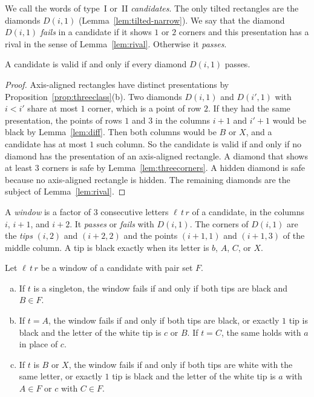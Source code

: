 We call the words of type~I or~II \emph{candidates}. The only tilted
rectangles are the diamonds $D(i,1)$ (Lemma~\ref{lem:tilted-narrow}). We say
that the diamond $D(i,1)$ \emph{fails} in a candidate if it shows $1$ or $2$
corners and this presentation has a rival in the sense of
Lemma~\ref{lem:rival}. Otherwise it \emph{passes}.

\begin{lemma}\label{lem:diamond}
A candidate is valid if and only if every diamond $D(i,1)$ passes.
\end{lemma}

\begin{proof}
Axis-aligned rectangles have distinct presentations by
Proposition~\ref{prop:threeclass}(b). Two diamonds $D(i,1)$ and $D(i',1)$ with
$i<i'$ share at most $1$ corner, which is a point of row $2$. If they had the
same presentation, the points of rows $1$ and $3$ in the columns $i+1$ and
$i'+1$ would be black by Lemma~\ref{lem:diff}. Then both columns would be $B$
or $X$, and a candidate has at most $1$ such column. So the candidate is valid
if and only if no diamond has the presentation of an axis-aligned rectangle.
A diamond that shows at least $3$ corners is safe by
Lemma~\ref{lem:threecorners}. A hidden diamond is safe because no axis-aligned
rectangle is hidden. The remaining diamonds are the subject of
Lemma~\ref{lem:rival}.
\end{proof}

A \emph{window} is a factor of $3$ consecutive letters $\ell\,t\,r$ of a
candidate, in the columns $i$, $i+1$, and $i+2$. It \emph{passes} or
\emph{fails} with $D(i,1)$. The corners of $D(i,1)$ are the \emph{tips} $(i,2)$
and $(i+2,2)$ and the points $(i+1,1)$ and $(i+1,3)$ of the middle column. A
tip is black exactly when its letter is $b$, $A$, $C$, or $X$.

\begin{lemma}\label{lem:windows}
Let $\ell\,t\,r$ be a window of a candidate with pair set $F$.
\begin{enumerate}[(a)]
\item If $t$ is a singleton, the window fails if and only if both tips are black and
$B\in F$.
\item If $t=A$, the window fails if and only if both tips are black, or exactly $1$
tip is black and the letter of the white tip is $c$ or $B$. If $t=C$, the same
holds with $a$ in place of $c$.
\item If $t$ is $B$ or $X$, the window fails if and only if both tips are white
with the same letter, or exactly $1$ tip is black and the letter of the white tip
is $a$ with $A\in F$ or $c$ with $C\in F$.
\end{enumerate}
\end{lemma}

